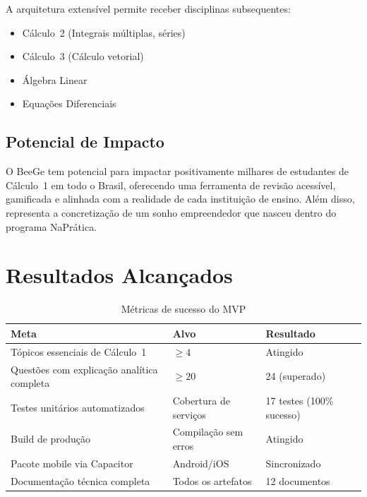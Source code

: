 \documentclass[12pt, a4paper]{article}
\begin{document}
A arquitetura extens\'{i}vel permite receber disciplinas subsequentes:

\begin{itemize}[leftmargin=2cm]
  \item C\'{a}lculo~2 (Integrais m\'{u}ltiplas, s\'{e}ries)
  \item C\'{a}lculo~3 (C\'{a}lculo vetorial)
  \item \'{A}lgebra Linear
  \item Equa\c{c}\~{o}es Diferenciais
\end{itemize}

\subsection{Potencial de Impacto}

\begin{destaque}
O BeeGe tem potencial para impactar positivamente milhares de estudantes de C\'{a}lculo~1 em todo o Brasil, oferecendo uma ferramenta de revis\~{a}o acess\'{i}vel, gamificada e alinhada com a realidade de cada institui\c{c}\~{a}o de ensino. Al\'{e}m disso, representa a concretiza\c{c}\~{a}o de um sonho empreendedor que nasceu dentro do programa NaPr\'{a}tica.
\end{destaque}

\section{Resultados Alcan\c{c}ados}

\begin{table}[H]
\centering
\caption{M\'{e}tricas de sucesso do MVP}
\begin{tabularx}{\textwidth}{X l l}
\toprule
\textbf{Meta} & \textbf{Alvo} & \textbf{Resultado} \\
\midrule
T\'{o}picos essenciais de C\'{a}lculo~1 & $\geq 4$ & Atingido \\
Quest\~{o}es com explica\c{c}\~{a}o anal\'{i}tica completa & $\geq 20$ & 24 (superado) \\
Testes unit\'{a}rios automatizados & Cobertura de servi\c{c}os & 17 testes (100\% sucesso) \\
Build de produ\c{c}\~{a}o & Compila\c{c}\~{a}o sem erros & Atingido \\
Pacote mobile via Capacitor & Android/iOS & Sincronizado \\
Documenta\c{c}\~{a}o t\'{e}cnica completa & Todos os artefatos & 12 documentos \\
\bottomrule
\end{tabularx}
\end{table}
\end{document}
